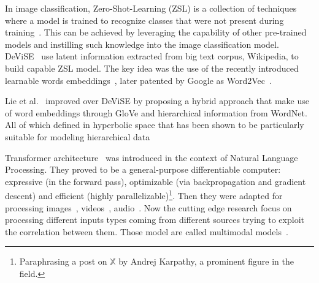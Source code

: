 In image classification, Zero-Shot-Learning (ZSL) is a collection of techniques
where a model is trained to recognize classes that were not present during
training~\cite{AnIntroductionSoysal2020}. This can be achieved by leveraging
the capability of other pre-trained models and instilling such knowledge into
the image classification model. DeViSE~\cite{DeviseADeepFrome2013} use latent
information extracted from big text corpus, Wikipedia, to build capable ZSL
model. The key idea was the use of the recently introduced learnable words
embeddings~\cite{EfficientEstimMikolo2013, DistributedRepMikolo2013}, later
patented by Google as Word2Vec~\cite{ComputingNumerMikolo2013}.

Lie et al.~\cite{HyperbolicVisuLiuS2020} improved over DeViSE by proposing a
hybrid approach that make use of word embeddings through GloVe and hierarchical
information from WordNet. All of which defined in hyperbolic space that has
been shown to be particularly suitable for modeling hierarchical
data\cite{PoincareEmbeddNickel2017, HyperbolicEntaGanea2018}








%


Transformer architecture~\cite{AttentionIsAlVaswan2017} was introduced in the
context of Natural Language Processing. They proved to be a general-purpose
differentiable computer: expressive (in the forward pass), optimizable (via
backpropagation and gradient descent) and efficient (highly
parallelizable)\footnote{Paraphrasing a post on $\mathbb{X}$ by Andrej
Karpathy, a prominent figure in the field.}. Then they were adapted for
processing images~\cite{ImageTransformParmar2018, EndToEndObjeCarion2020,
AnImageIsWorDosovi2020}, videos~\cite{VivitAVideoArnab2021,
TemporalContexShao2020}, audio~\cite{NeuralSpeechSLiNa2018,
SpeechTransforDong2018, ConformerConvGulati2020}. Now the cutting edge research
focus on processing different inputs types coming from different sources trying
to exploit the correlation between them. Those model are called multimodal
models~\cite{ASurveyOnMulYinS2023}.

